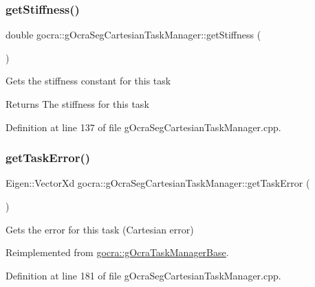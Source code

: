 \subsubsection{\texorpdfstring{get\+Stiffness()}{getStiffness()}}
{\footnotesize\ttfamily double gocra\+::g\+Ocra\+Seg\+Cartesian\+Task\+Manager\+::get\+Stiffness (\begin{DoxyParamCaption}{ }\end{DoxyParamCaption})}

Gets the stiffness constant for this task

\begin{DoxyReturn}{Returns}
The stiffness for this task 
\end{DoxyReturn}


Definition at line 137 of file g\+Ocra\+Seg\+Cartesian\+Task\+Manager.\+cpp.

\hypertarget{classgocra_1_1gOcraSegCartesianTaskManager_a12418bbcfafcc5f7aab8b6f8013880a4}{}\label{classgocra_1_1gOcraSegCartesianTaskManager_a12418bbcfafcc5f7aab8b6f8013880a4} 
\subsubsection{\texorpdfstring{get\+Task\+Error()}{getTaskError()}}
{\footnotesize\ttfamily Eigen\+::\+Vector\+Xd gocra\+::g\+Ocra\+Seg\+Cartesian\+Task\+Manager\+::get\+Task\+Error (\begin{DoxyParamCaption}{ }\end{DoxyParamCaption})\hspace{0.3cm}{\ttfamily [virtual]}}

Gets the error for this task (Cartesian error) 

Reimplemented from \hyperlink{classgocra_1_1gOcraTaskManagerBase_a5c40a14b3a1d5a6519da422310d28f97}{gocra\+::g\+Ocra\+Task\+Manager\+Base}.



Definition at line 181 of file g\+Ocra\+Seg\+Cartesian\+Task\+Manager.\+cpp.

\hypertarget{classgocra_1_1gOcraSegCartesianTaskManager_a96d208274095c39ddcdb0861290168ab}{}\label{classgocra_1_1gOcraSegCartesianTaskManager_a96d208274095c39ddcdb0861290168ab} 
